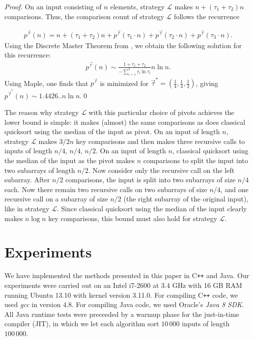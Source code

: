 \documentclass[prodmode,acmtalg]{acmsmall}
\let\accentvec\vec
\let\vec\accentvec
\newcommand{\Cpp}{C{}\texttt{++}{}}
\begin{document}
\begin{proof}
    On an input consisting of $n$ elements, strategy $\mathcal{L}$ makes $n +
    (\tau_1 + \tau_2) n$ comparisons. 
    Thus, the comparison count of strategy $\mathcal{L}$ follows the recurrence

    \begin{align*}
	p^{\vec{\tau}}(n) = n + (\tau_1 + \tau_2) n +
	p^{\vec{\tau}}(\tau_1 \cdot n) +
	p^{\vec{\tau}}(\tau_2 \cdot n) +
	p^{\vec{\tau}}(\tau_3 \cdot n).
    \end{align*}
Using the Discrete Master Theorem from \cite[Theorem 2.3, Case (2.1)]{Roura01}, we obtain the
    following solution for this recurrence:
    \begin{align*}
	p^{\vec{\tau}}(n) \sim \frac{1 + \tau_1 + \tau_2}{-\sum_{i = 1}^{3} \tau_i \ln
	\tau_i} n \ln n.
    \end{align*}
Using Maple\textsuperscript{\textregistered}, one finds that $p^{\vec\tau}$ is minimized for
    $\vec{\tau}^\ast = (\frac14,\frac14,\frac12)$, giving $p^{\vec{\tau}^\ast}(n)
    \sim
    1.4426.. n \ln n$.\qed 
\end{proof}
The reason why strategy $\mathcal{L}$ with this particular choice of pivots
achieves the lower bound is simple: it makes (almost) the same comparisons as does classical
quicksort using the median of the input as pivot. On an input of
length $n$, strategy $\mathcal{L}$ makes $3/2n$ key comparisons and then
makes three recursive calls to inputs of length $n/4$, $n/4$, $n/2$. On an 
input of length $n$, classical 
quicksort using the median of the input as the pivot makes $n$ comparisons to
split the input into two subarrays of length $n/2$. Now consider only the
recursive call on the left subarray. After $n/2$ comparisons, the input is split
into two subarrays of size $n/4$ each. Now there remain two recursive calls on
two subarrays of size $n/4$, and one recursive call on a subarray of size $n/2$ (the
right subarray of the original input), like in strategy $\mathcal{L}$. Since
classical quicksort using the median of the input clearly makes $n \log n$ key
comparisons, this bound must also hold for strategy $\mathcal{L}$.





\section{Experiments}\label{sec:experiments}
We have implemented the methods presented in this paper in {\Cpp} and Java.
Our experiments were carried out on an Intel i7-2600 at 3.4 GHz 
with 16 GB RAM running Ubuntu 13.10 with kernel version 3.11.0. 
For compiling {\Cpp} code, we used \emph{gcc} in version 4.8.
For compiling Java code, we used Oracle's \emph{Java 8 SDK}. All Java runtime tests
were preceeded by a warmup phase for the just-in-time compiler (JIT), in which we let each algorithm
sort $10\,000$ inputs of length $100\,000$.
\end{document}
